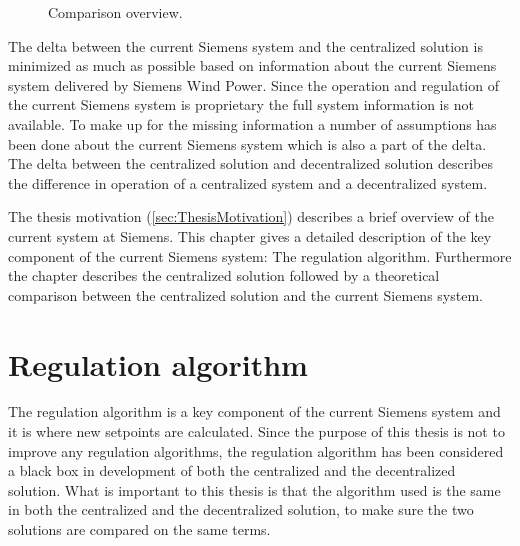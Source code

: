 \begin{figure}[!h]
	\centering
	
	\caption[Comparison overview]{
		\label{fig:projectDiffOverview} 
		\footnotesize{%
			Comparison overview.
		}
	}
\end{figure}

The delta between the current Siemens system and the centralized solution is minimized as much as possible based on information about the current Siemens system delivered by Siemens Wind Power. Since the operation and regulation of the current Siemens system is proprietary the full system information is not available. To make up for the missing information a number of assumptions has been done about the current Siemens system which is also a part of the delta.
The delta between the centralized solution and decentralized solution describes the difference in operation of a centralized system and a decentralized system.

The thesis motivation (\cref{sec:ThesisMotivation}) describes a brief overview of the current system at Siemens. This chapter gives a detailed description of the key component of the current Siemens system: The regulation algorithm. Furthermore the chapter describes the centralized solution followed by a theoretical comparison between the centralized solution and the current Siemens system. 

\section{Regulation algorithm}\label{sec:cenRegAlgorithm}

The regulation algorithm is a key component of the current Siemens system and it is where new setpoints are calculated. Since the purpose of this thesis is not to improve any regulation algorithms, the regulation algorithm has been considered a black box in development of both the centralized and the decentralized solution. What is important to this thesis is that the algorithm used is the same in both the centralized and the decentralized solution, to make sure the two solutions are compared on the same terms. 



